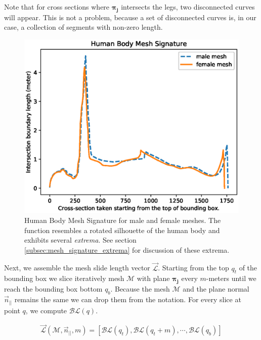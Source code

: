 \documentclass[runningheads, orivec]{llncs}
\begin{document}
Note that for cross sections where $\boldsymbol{\pi_j}$ intersects the legs, 
two 
disconnected curves will appear. This is not a problem, because a 
set of disconnected curves is, in our case, a collection of segments with 
non-zero length.

\begin{figure}[t]
	\begin{center}
		\includegraphics[width=\linewidth]{Figure_1.eps}
	\end{center}
	\caption{Human Body Mesh Signature for male and female meshes. The 
		function resembles a rotated silhouette of the human body and exhibits 
		several \textit{extrema}. See section 
		\ref{subsec:mesh_signature_extrema} for discussion of these extrema.}
	\label{fig:hbm_signature}
\end{figure}

Next, we assemble the mesh slide length vector $\vec{\mathcal{L}}$. Starting 
from the 
top $q_t$ of the bounding box we slice iteratively mesh $\mathcal{M}$ with 
plane 
$\boldsymbol{\pi_j}$ every $m$-meters until we reach the bounding box bottom 
$q_b$. Because the mesh $\mathcal{M}$ and the plane normal $\vec{n}_{||}$ 
remains the same we can drop them from the notation. For every slice at point 
$q$, we compute $\mathcal{BL}(q)$.

\begin{align}
\vec{\mathcal{L}}(\mathcal{M}, \vec{n}_{||}, m) = \left[ \mathcal{BL}(q_t), 
\mathcal{BL}(q_t+m), \cdots, \mathcal{BL}(q_b) \right]
\end{align}
\end{document}
